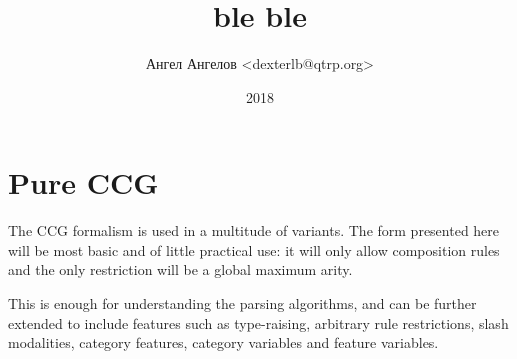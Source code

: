 \documentclass[12pt]{extarticle}
\title{ble ble}
\author{Ангел Ангелов <dexterlb@qtrp.org>}
\date{2018}
\theoremstyle{definition} \newtheorem{defn}{Definition}
\theoremstyle{definition} \newtheorem{prop}{Proposition}
\begin{document}

\section{Pure CCG}
The CCG formalism is used in a multitude of variants. The form presented here
will be most basic and of little practical use: it will only allow composition
rules and the only restriction will be a global maximum arity.

This is enough for understanding the parsing algorithms, and can be further
extended to include features such as type-raising,
arbitrary rule restrictions, slash modalities,
category features, category variables and feature variables.
\end{document}
